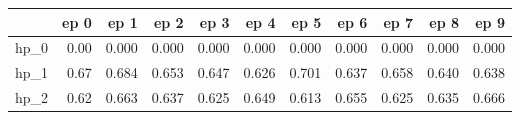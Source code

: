 \begin{tabular}{lrrrrrrrrrr}
\toprule
{} &  ep 0 &   ep 1 &   ep 2 &   ep 3 &   ep 4 &   ep 5 &   ep 6 &   ep 7 &   ep 8 &   ep 9 \\
\midrule
hp\_0 &  0.00 &  0.000 &  0.000 &  0.000 &  0.000 &  0.000 &  0.000 &  0.000 &  0.000 &  0.000 \\
hp\_1 &  0.67 &  0.684 &  0.653 &  0.647 &  0.626 &  0.701 &  0.637 &  0.658 &  0.640 &  0.638 \\
hp\_2 &  0.62 &  0.663 &  0.637 &  0.625 &  0.649 &  0.613 &  0.655 &  0.625 &  0.635 &  0.666 \\
\bottomrule
\end{tabular}
